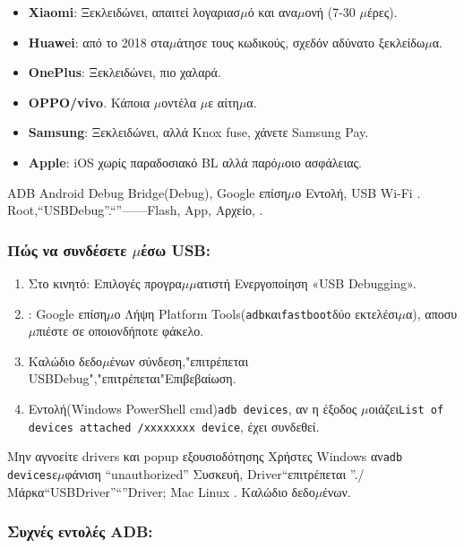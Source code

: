 \begin{itemize}
  \item \textbf{Xiaomi}: Ξεκλειδώνει, απαιτεί λογαριασ$\mu$ό και ανα$\mu$ονή (7-30 $\mu$έρες).
  \item \textbf{Huawei}: από το 2018 στα$\mu$άτησε τους κωδικούς, σχεδόν αδύνατο ξεκλείδω$\mu$α.
  \item \textbf{OnePlus}: Ξεκλειδώνει, πιο χαλαρά.
  \item \textbf{OPPO/vivo}. Κάποια $\mu$οντέλα $\mu$ε αίτη$\mu$α.
  \item \textbf{Samsung}: Ξεκλειδώνει, αλλά Knox fuse, χάνετε Samsung Pay.
  \item \textbf{Apple}: iOS χωρίς παραδοσιακό BL αλλά παρό$\mu$οιο ασφάλειας.
\end{itemize}


ADB Android Debug Bridge(Debug), Google επίση$\mu$ο Εντολή, USB Wi-Fi . Root,“USBDebug”.“”——Flash, App, Αρχείο, .

\subsubsection*{Πώς να συνδέσετε $\mu$έσω USB:}

\begin{enumerate}
  \item Στο κινητό: Επιλογές προγρα$\mu$$\mu$ατιστή Ενεργοποίηση «USB Debugging».
  \item : Google επίση$\mu$ο Λήψη Platform Tools(\texttt{adb}και\texttt{fastboot}δύο εκτελέσι$\mu$α), αποσυ$\mu$πιέστε σε οποιονδήποτε φάκελο.
  \item Καλώδιο δεδο$\mu$ένων σύνδεση,"επιτρέπεται USBDebug","επιτρέπεται"Επιβεβαίωση.
  \item Εντολή(Windows PowerShell cmd)\texttt{adb devices}, αν η έξοδος $\mu$οιάζει\texttt{List of devices attached /\allowbreak  xxxxxxxx device}, έχει συνδεθεί.
\end{enumerate}

\begin{tcbwarn}{Μην αγνοείτε drivers και popup εξουσιοδότησης}
Χρήστες Windows αν\texttt{adb devices}ε$\mu$φάνιση “unauthorized” Συσκευή, Driver“επιτρέπεται ”./Μάρκα“USBDriver”“”Driver; Mac Linux . Καλώδιο δεδο$\mu$ένων.

\end{tcbwarn}

\subsubsection*{Συχνές εντολές ADB:}

